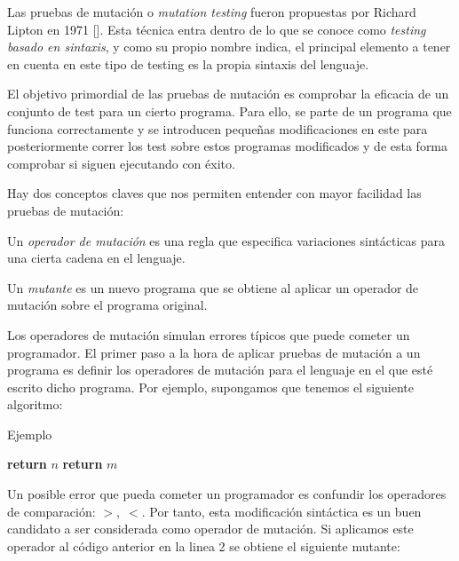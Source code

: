 Las pruebas de mutación o \textit{mutation testing} fueron propuestas por Richard Lipton en 1971 [\cite{lipton1971fault}]. Esta técnica entra dentro de lo que se conoce como \textit{testing basado en sintaxis}, y como su propio nombre indica, el principal elemento a tener en cuenta en este tipo de testing es la propia sintaxis del lenguaje.

El objetivo primordial de las pruebas de mutación es comprobar la eficacia de un conjunto de test para un cierto programa. Para ello, se parte de un programa que funciona correctamente y se introducen pequeñas modificaciones en este para posteriormente correr los test sobre estos programas modificados y de esta forma comprobar si siguen ejecutando con éxito.

Hay dos conceptos claves que nos permiten entender con mayor facilidad las pruebas de mutación:
\begin{definition}
Un \emph{operador de mutación} es una regla que especifica variaciones sintácticas para una cierta cadena en el lenguaje.
\end{definition}

\begin{definition}
Un \emph{mutante} es un nuevo programa que se obtiene al aplicar un operador de mutación sobre el programa original.
\end{definition}

Los operadores de mutación simulan errores típicos que puede cometer un programador. El primer paso a la hora de aplicar pruebas de mutación a un programa es definir los operadores de mutación para el lenguaje en el que esté escrito dicho programa. Por ejemplo, supongamos que tenemos el siguiente algoritmo:
\clearpage 

\begin{algorithm}
\caption{Ejemplo}
\begin{algorithmic}[1]
    \State  \textbf{return} $n$
\Else
    \State \textbf{return} $m$
\EndIf
\EndProcedure
\end{algorithmic}
\end{algorithm}


Un posible error que pueda cometer un programador es confundir los operadores de comparación: $>,\; <$. Por tanto, esta modificación sintáctica es un buen candidato a ser considerada como operador de mutación. Si aplicamos este operador al código anterior en la linea 2 se obtiene el siguiente mutante:

